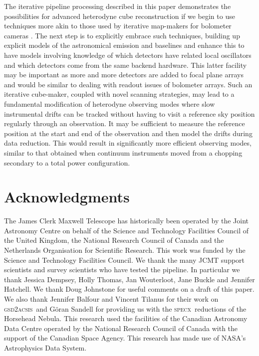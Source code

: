 \documentclass[a4paper,fleqn,usenatbib]{mnras}
\newcommand{\specx}{\textsc{specx}}
\newcommand{\gsdacsis}{\textsc{gsd{\footnotesize{2}}acsis}}
\begin{document}
The iterative pipeline processing described in this paper demonstrates
the possibilities for advanced heterodyne cube reconstruction if we
begin to use techniques more akin to those used by iterative
map-makers for bolometer cameras
\citep[e.g.,][]{2013MNRAS.430.2545C}. The next step is to explicitly
embrace such techniques, building up explicit models of the
astronomical emission and baselines and enhance this to have models
involving knowledge of which detectors have related local oscillators
and which detectors come from the same backend hardware. This latter
facility may be important as more and more detectors are added to
focal plane arrays and would be similar to dealing with readout issues
of bolometer arrays. Such an iterative cube-maker, coupled with novel
scanning strategies, may lead to a fundamental modification of
heterodyne observing modes where slow instrumental drifts can be
tracked without having to visit a reference sky position regularly
through an observation. It may be sufficient to measure the reference
position at the start and end of the observation and then model the
drifts during data reduction. This would result in significantly more
efficient observing modes, similar to that obtained when continuum
instruments moved from a chopping secondary to a total power
configuration.

\section*{Acknowledgments}

The James Clerk Maxwell Telescope has historically been operated by
the Joint Astronomy Centre on behalf of the Science and Technology
Facilities Council of the United Kingdom, the National Research
Council of Canada and the Netherlands Organisation for Scientific
Research. This work was funded by the Science and Technology Facilities
Council. We thank the many JCMT support scientists and survey
scientists who have tested the pipeline. In particular we thank
Jessica Dempsey, Holly Thomas, Jan Wouterloot, Jane Buckle and
Jennifer Hatchell. We thank Doug Johnstone for useful comments on a
draft of this paper. We also thank Jennifer Balfour and
Vincent Tilanus for their work on \gsdacsis\ and
G\"{o}ran Sandell for providing us with the \specx\ reductions of the Horsehead
Nebula. This research used the facilities of the Canadian Astronomy
Data Centre operated by the National Research Council of Canada with
the support of the Canadian Space Agency. This research has made use
of NASA's Astrophysics Data System.
\end{document}

